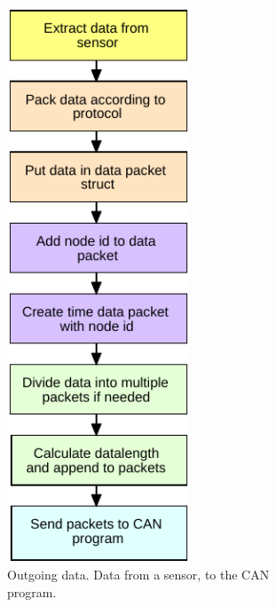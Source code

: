 \begin{figure}[!h]
\centering
\begin{subfigure}{0.45\textwidth}
\centering
\includegraphics[width=0.60\textwidth]{graphics/FlowChart_Node_Packing}
\caption{Outgoing data. Data from a sensor, to the CAN program.}
\label{fig:filter_1}
\end{subfigure}
~
\begin{subfigure}{0.45\textwidth}
\centering

\end{subfigure}
\end{figure}
